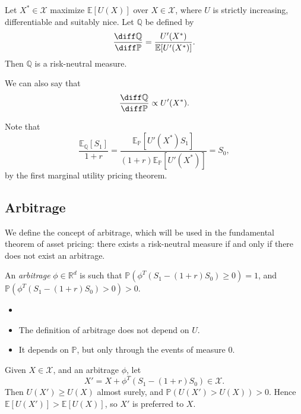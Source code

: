 \documentclass[12pt]{article}
\begin{document}
\begin{theorem}
	Let $X^{\ast} \in \mathcal{X}$ maximize $\mathbb{E}[U(X)]$ over $X \in \mathcal{X}$, where $U$ is strictly increasing, differentiable and suitably nice. Let $\mathbb{Q}$ be defined by
	\[
	\frac{\diff \mathbb{Q}}{\diff \mathbb{P}} = \frac{U'(X^{\ast})}{\mathbb{E}[U'(X^{\ast})]}.
	\]
	Then $\mathbb{Q}$ is a risk-neutral measure.
\end{theorem}

We can also say that
\[
\frac{\diff \mathbb{Q}}{\diff \mathbb{P}} \propto U'(X^{\ast}).
\]

\begin{proofbox}
	Note that
	\[
	\frac{\mathbb{E}_{\mathbb{Q}}[S_1]}{1+r} = \frac{\mathbb{E}_{\mathbb{P}}[U'(X^{\ast})S_1]}{(1+r) \mathbb{E}_{\mathbb{P}}[U'(X^{\ast})]} = S_0,
	\]
	by the first marginal utility pricing theorem.
\end{proofbox}

\subsection{Arbitrage}
\label{sub:arbitrage}

We define the concept of arbitrage, which will be used in the fundamental theorem of asset pricing: there exists a risk-neutral measure if and only if there does not exist an arbitrage.

\begin{definition}
	An \emph{arbitrage} $\phi \in \mathbb{R}^{d}$ is such that $\mathbb{P}(\phi^{T}(S_1 - (1+r)S_0) \geq 0) = 1$, and $\mathbb{P}(\phi^{T}(S_1 - (1+r)S_0) > 0) > 0$.
\end{definition}

\begin{remark}
	\begin{itemize}
		\item[]
		\item The definition of arbitrage does not depend on $U$.
		\item It depends on $\mathbb{P}$, but only through the events of measure $0$.
	\end{itemize}
\end{remark}

Given $X \in \mathcal{X}$, and an arbitrage $\phi$, let
\[
X' = X + \phi^{T}(S_1 - (1+r)S_0) \in \mathcal{X}.
\]
Then $U(X') \geq U(X)$ almost surely, and $\mathbb{P}(U(X') > U(X)) > 0$. Hence $\mathbb{E}[U(X')] > \mathbb{E}[U(X)]$, so $X'$ is preferred to $X$.
\end{document}
